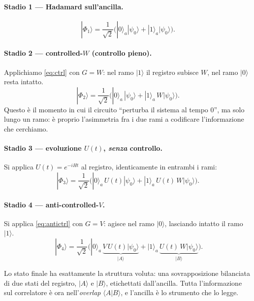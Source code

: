 \documentclass[11pt,a4paper]{article}
\begin{document}
\paragraph{Stadio 1 --- Hadamard sull'ancilla.}
\begin{equation}
|\Phi_1\rangle=\frac{1}{\sqrt2}\Big(|0\rangle_a|\psi_0\rangle+|1\rangle_a|\psi_0\rangle\Big).
\end{equation}

\paragraph{Stadio 2 --- controlled-$W$ (controllo pieno).}
Applichiamo \eqref{eq:ctrl} con $G=W$: nel ramo $|1\rangle$ il registro subisce $W$, nel ramo
$|0\rangle$ resta intatto.
\begin{equation}
|\Phi_2\rangle=\frac{1}{\sqrt2}\Big(|0\rangle_a\,|\psi_0\rangle+|1\rangle_a\,W|\psi_0\rangle\Big).
\end{equation}
Questo è il momento in cui il circuito ``perturba il sistema al tempo $0$'', ma solo lungo un
ramo: è proprio l'asimmetria fra i due rami a codificare l'informazione che cerchiamo.

\paragraph{Stadio 3 --- evoluzione $U(t)$, \emph{senza} controllo.}
Si applica $U(t)=e^{-iHt}$ al registro, identicamente in entrambi i rami:
\begin{equation}
|\Phi_3\rangle=\frac{1}{\sqrt2}\Big(|0\rangle_a\,U(t)|\psi_0\rangle+|1\rangle_a\,U(t)\,W|\psi_0\rangle\Big).
\label{eq:phi3}
\end{equation}

\paragraph{Stadio 4 --- anti-controlled-$V$.}
Si applica \eqref{eq:antictrl} con $G=V$: agisce nel ramo $|0\rangle$, lasciando intatto il ramo
$|1\rangle$.
\begin{equation}
\boxed{\;|\Phi_4\rangle=\frac{1}{\sqrt2}\Big(|0\rangle_a\,\underbrace{V\,U(t)|\psi_0\rangle}_{\textstyle |A\rangle}
+|1\rangle_a\,\underbrace{U(t)\,W|\psi_0\rangle}_{\textstyle |B\rangle}\Big).}
\label{eq:phi4}
\end{equation}

Lo stato finale ha esattamente la struttura voluta: una sovrapposizione bilanciata di due stati
del registro, $|A\rangle$ e $|B\rangle$, etichettati dall'ancilla. Tutta l'informazione sul
correlatore è ora nell'\emph{overlap} $\langle A|B\rangle$, e l'ancilla è lo strumento che lo
legge.
\end{document}
